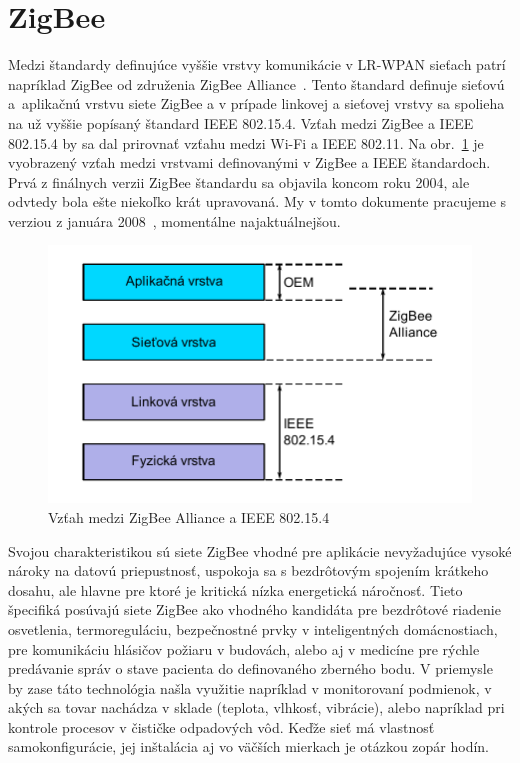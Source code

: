 \section{ZigBee}
\indent\indent Medzi štandardy definujúce vyššie vrstvy komunikácie v LR-WPAN sieťach patrí napríklad ZigBee od združenia ZigBee Alliance~\cite{zigbee08}. Tento štandard definuje sieťovú a~aplikačnú vrstvu siete ZigBee a v prípade linkovej a sieťovej vrstvy sa spolieha na už vyššie popísaný štandard IEEE 802.15.4. Vzťah medzi ZigBee a IEEE 802.15.4 by sa dal prirovnať vzťahu medzi Wi-Fi a IEEE 802.11. Na obr.~\ref{fig:zigbee_ieee} je vyobrazený vzťah medzi vrstvami definovanými v ZigBee a IEEE štandardoch. Prvá z finálnych verzii ZigBee štandardu sa objavila koncom roku 2004, ale odvtedy bola ešte niekoľko krát upravovaná. My v tomto dokumente pracujeme s verziou z januára 2008~\cite{zigbee08}, momentálne najaktuálnejšou.\\
\begin{figure}[htbp]
\begin{center}
\includegraphics[width=140mm]{figures/zigbee_ieee}
\caption{Vzťah medzi ZigBee Alliance a IEEE 802.15.4}
\label{fig:zigbee_ieee}
\end{center}
\end{figure}
\indent Svojou charakteristikou sú siete ZigBee vhodné pre aplikácie nevyžadujúce vysoké nároky na datovú priepustnosť, uspokoja sa s bezdrôtovým spojením krátkeho dosahu, ale hlavne pre ktoré je kritická nízka energetická náročnosť. Tieto špecifiká posúvajú sie\-te ZigBee ako vhodného kandidáta pre bezdrôtové riadenie osvetlenia, termoreguláciu, bezpečnostné prvky v inteligentných domácnostiach, pre komunikáciu hlásičov požiaru v budovách, alebo aj v medicíne pre rýchle predávanie správ o stave pacienta do definovaného zberného bodu. V priemysle by zase táto technológia našla využitie napríklad v monitorovaní podmienok, v akých sa tovar nachádza v sklade (teplota, vlhkosť, vibrácie), alebo napríklad pri kontrole procesov v čističke odpadových vôd. Keďže sieť má vlastnosť samokonfigurácie, jej inštalácia aj vo väčších mierkach je otázkou zopár hodín.\\

